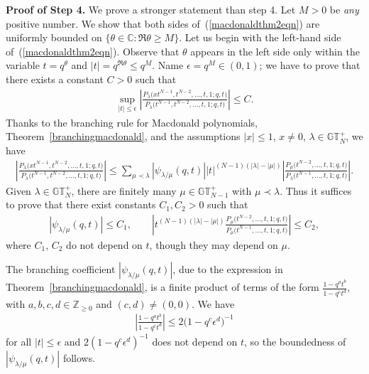 \documentclass[11pt]{article}
\numberwithin{equation}{section}
\newcommand{\C}{\mathbb{C}}
\newcommand{\Z}{\mathbb{Z}}
\newcommand{\GTp}{\mathbb{GT}^+}
\begin{document}
\textbf{Proof of Step 4.} We prove a stronger statement than step 4. Let $M > 0$ be \textit{any} positive number. We show that both sides of~(\ref{macdonaldthm2eqn}) are uniformly bounded on $\{\theta\in\C\colon \Re\theta \geq M\}$. Let us begin with the left-hand side of~(\ref{macdonaldthm2eqn}). Observe that $\theta$ appears in the left side only within the variable $t = q^{\theta}$ and $|t| = q^{\Re\theta} \leq q^M$. Name $\epsilon = q^M\in (0, 1)$; we have to prove that there exists a constant $C > 0$ such that
\begin{gather*}
\sup_{|t| \leq \epsilon}{\left| \frac{P_{\lambda}\big(xt^{N-1}, t^{N-2}, \dots, t, 1; q, t\big)}{P_{\lambda}\big(t^{N-1}, t^{N-2}, \dots, t, 1; q, t\big)} \right|} \leq C.
\end{gather*}
Thanks to the branching rule for Macdonald polynomials, Theorem~\ref{branchingmacdonald}, and the assumptions $|x|\leq 1$, $x \neq 0$, $\lambda\in\GTp_N$, we have
\begin{gather*}
\left| \frac{P_{\lambda}\big(xt^{N-1}, t^{N-2}, \dots, t, 1; q, t\big)}{P_{\lambda}\big(t^{N-1}, t^{N-2}, \dots, t, 1; q, t\big)} \right| \leq \sum_{\mu\prec\lambda}{|\psi_{\lambda/\mu}(q, t)| |t|^{(N-1)(|\lambda| - |\mu|)} \left| \frac{P_{\mu}\big(t^{N-2}, \dots, t, 1; q, t\big)}{P_{\lambda}\big(t^{N-1}, \dots, t, 1; q, t\big)} \right| }.
\end{gather*}
Given $\lambda\in\GTp_N$, there are f\/initely many $\mu\in\GTp_{N-1}$ with $\mu\prec\lambda$. Thus it suf\/f\/ices to prove that there exist constants $C_1, C_2 > 0$ such that
\begin{gather*}
|\psi_{\lambda/\mu}(q, t)| \leq C_1, \qquad \left| t^{(N-1)(|\lambda| - |\mu|)}\frac{P_{\mu}\big(t^{N-2}, \dots, t, 1; q, t\big)}{P_{\mu}\big(t^{N-1}, \dots, t, 1; q, t\big)} \right| \leq C_2,
\end{gather*}
where $C_1$, $C_2$ do not depend on $t$, though they may depend on $\mu$.

The branching coef\/f\/icient $|\psi_{\lambda/\mu}(q, t)|$, due to the expression in Theorem~\ref{branchingmacdonald}, is a f\/inite product of terms of the form $\frac{1 - q^at^b}{1 - q^ct^d}$, with $a, b, c, d\in\Z_{\geq 0}$ and $(c, d)\neq (0, 0)$. We have{\samepage
\begin{gather*}
\left| \frac{1 - q^at^b}{1 - q^ct^d} \right| \leq 2\big(1 - q^c\epsilon^d\big)^{-1}
\end{gather*}
for all $|t|\leq\epsilon$ and $2(1 - q^c\epsilon^d)^{-1}$ does not depend on $t$, so the boundedness of $|\psi_{\lambda/\mu}(q, t)|$ follows.}
\end{document}
